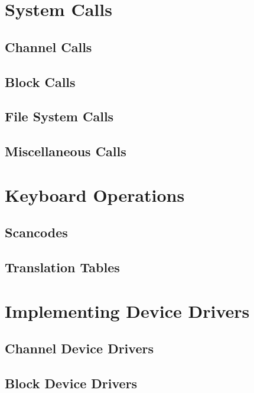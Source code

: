 \documentclass{report}
\begin{document}
\chapter{System Calls}

\section{Channel Calls}

\section{Block Calls}

\section{File System Calls}

\section{Miscellaneous Calls}

\chapter{Keyboard Operations}

\section{Scancodes}

\section{Translation Tables}

\chapter{Implementing Device Drivers}

\section{Channel Device Drivers}

\section{Block Device Drivers}
\end{document}
